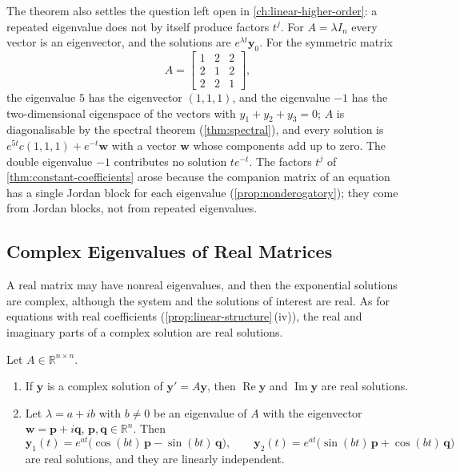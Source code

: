 The theorem also settles the question left open in \cref{ch:linear-higher-order}: a repeated eigenvalue does not by itself produce factors $t^j$. For $A=\lambda I_n$ every vector is an eigenvector, and the solutions are $e^{\lambda t}\mathbf y_0$. For the symmetric matrix
\[
A=\begin{bmatrix}1&2&2\\2&1&2\\2&2&1\end{bmatrix},
\]
the eigenvalue $5$ has the eigenvector $(1,1,1)$, and the eigenvalue $-1$ has the two-dimensional eigenspace of the vectors with $y_1+y_2+y_3=0$; $A$ is diagonalisable by the spectral theorem (\cref{thm:spectral}), and every solution is $e^{5t}c(1,1,1)+e^{-t}\mathbf w$ with a vector $\mathbf w$ whose components add up to zero. The double eigenvalue $-1$ contributes no solution $te^{-t}$. The factors $t^j$ of \cref{thm:constant-coefficients} arose because the companion matrix of an equation has a single Jordan block for each eigenvalue (\cref{prop:nonderogatory}); they come from Jordan blocks, not from repeated eigenvalues.

\subsection{Complex Eigenvalues of Real Matrices}

A real matrix may have nonreal eigenvalues, and then the exponential solutions are complex, although the system and the solutions of interest are real. As for equations with real coefficients (\cref{prop:linear-structure}\,(iv)), the real and imaginary parts of a complex solution are real solutions.

\begin{proposition}
\label{prop:real-solutions}
Let $A\in\mathbb R^{n\times n}$.
\begin{enumerate}
\item If $\mathbf y$ is a complex solution of $\mathbf y'=A\mathbf y$, then $\operatorname{Re}\mathbf y$ and $\operatorname{Im}\mathbf y$ are real solutions.
\item Let $\lambda=a+ib$ with $b\ne0$ be an eigenvalue of $A$ with the eigenvector $\mathbf w=\mathbf p+i\mathbf q$, $\mathbf p,\mathbf q\in\mathbb R^n$. Then
\begin{equation}
\mathbf y_1(t)=e^{at}\bigl(\cos(bt)\,\mathbf p-\sin(bt)\,\mathbf q\bigr),\qquad\mathbf y_2(t)=e^{at}\bigl(\sin(bt)\,\mathbf p+\cos(bt)\,\mathbf q\bigr)
\label{eq:real-complex-solutions}
\end{equation}
are real solutions, and they are linearly independent.
\end{enumerate}
\end{proposition}

